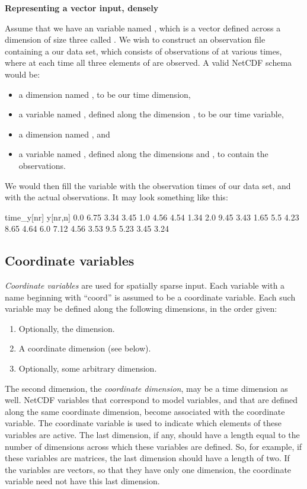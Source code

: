 \begin{example}
\noindent \textbf{Representing a vector input, densely}

Assume that we have an  variable named , which is a vector
defined across a dimension of size three called . We wish to construct
an observation file containing a our data set, which consists of observations
of  at various times, where at each time all three elements of
 are observed. A valid NetCDF schema would be:
\begin{itemize}
\item a dimension named , to be our time dimension,
\item a variable named , defined along the dimension ,
  to be our time variable,
\item a dimension named , and
\item a variable named , defined along the dimensions  and
  , to contain the observations.
\end{itemize}
We would then fill the variable  with the observation times of
our data set, and  with the actual observations. It may look something
like this:

\begin{cmdcode}
time_y[nr]            y[nr,n]
       0.0     6.75 3.34 3.45
       1.0     4.56 4.54 1.34
       2.0     9.45 3.43 1.65
       5.5     4.23 8.65 4.64
       6.0     7.12 4.56 3.53
       9.5     5.23 3.45 3.24
\end{cmdcode}

\end{example}

\subsection{Coordinate variables\label{Coordinate_variables}}

\emph{Coordinate variables} are used for spatially sparse input. Each variable
with a name beginning with ``coord'' is assumed to be a coordinate
variable. Each such variable may be defined along the following dimensions, in
the order given:
\begin{enumerate}
\item Optionally, the  dimension.
\item A coordinate dimension (see below).
\item Optionally, some arbitrary dimension.
\end{enumerate}
The second dimension, the \emph{coordinate
  dimension}, may be a time dimension as
well. NetCDF variables that correspond to model variables, and that are
defined along the same coordinate dimension, become associated with the
coordinate variable. The coordinate variable is used to indicate which
elements of these variables are active. The last dimension, if any, should
have a length equal to the number of dimensions across which these variables
are defined. So, for example, if these variables are matrices, the last
dimension should have a length of two. If the variables are vectors, so that
they have only one dimension, the coordinate variable need not have this last
dimension.

